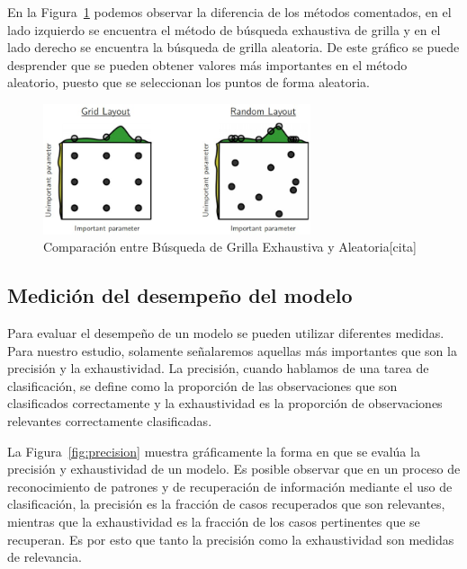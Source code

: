 En la Figura~\ref{fig:gridsearch} podemos observar la diferencia de los métodos comentados, en el lado izquierdo se encuentra el método de búsqueda exhaustiva de grilla y en el lado derecho se encuentra la búsqueda de grilla aleatoria. De este gráfico se puede desprender que se pueden obtener valores más importantes en el método aleatorio, puesto que se seleccionan los puntos de forma aleatoria.
       \begin{figure}[]
        \centering
        \includegraphics[width=0.7\textwidth]{Figuras/gridsearchbad.jpg}
         \caption{Comparación entre Búsqueda de Grilla Exhaustiva y Aleatoria[cita]}
         \label{fig:gridsearch}
      \end{figure}
\subsection{Medición del desempeño del modelo}

Para evaluar el desempeño de un modelo se pueden utilizar diferentes medidas. Para nuestro estudio, solamente señalaremos aquellas más importantes que son la precisión y la exhaustividad. La precisión, cuando hablamos de una tarea de clasificación, se define como la proporción de las observaciones que son clasificados correctamente y la exhaustividad es la proporción de observaciones relevantes correctamente clasificadas.

La Figura~\ref{fig:precision} muestra gráficamente la forma en que se evalúa la precisión y exhaustividad de un modelo. Es posible observar que en un proceso de reconocimiento de patrones y de recuperación de información mediante el uso de  clasificación, la precisión es la fracción de casos recuperados que son relevantes, mientras que la exhaustividad es la fracción de los casos pertinentes que se recuperan. Es por esto que tanto la precisión como la exhaustividad son medidas de relevancia.

